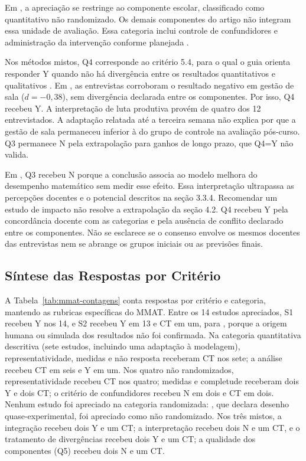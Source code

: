 Em , a apreciação se restringe ao componente escolar, classificado como quantitativo não randomizado. Os demais componentes do artigo não integram essa unidade de avaliação. Essa categoria inclui controle de confundidores e administração da intervenção conforme planejada \cite{MMAT2018}.

Nos métodos mistos, Q4 corresponde ao critério 5.4, para o qual o guia orienta responder Y quando não há divergência entre os resultados quantitativos e qualitativos \cite{MMATGuide2018}. Em , as entrevistas corroboram o resultado negativo em gestão de sala ($d=-0{,}38$), sem divergência declarada entre os componentes. Por isso, Q4 recebeu Y. A interpretação de luta produtiva provém de quatro dos 12 entrevistados. A adaptação relatada até a terceira semana não explica por que a gestão de sala permaneceu inferior à do grupo de controle na avaliação pós-curso. Q3 permanece N pela extrapolação para ganhos de longo prazo, que Q4=Y não valida.

Em , Q3 recebeu N porque a conclusão associa ao modelo melhora do desempenho matemático sem medir esse efeito. Essa interpretação ultrapassa as percepções docentes e o potencial descritos na seção 3.3.4. Recomendar um estudo de impacto não resolve a extrapolação da seção 4.2. Q4 recebeu Y pela concordância docente com as categorias e pela ausência de conflito declarado entre os componentes. Não se esclarece se o consenso envolve os mesmos docentes das entrevistas nem se abrange os grupos iniciais ou as previsões finais.

\subsection{Síntese das Respostas por Critério}

A Tabela~\ref{tab:mmat-contagens} conta respostas por critério e categoria, mantendo as rubricas específicas do MMAT. Entre os 14 estudos apreciados, S1 recebeu Y nos 14, e S2 recebeu Y em 13 e CT em um, para , porque a origem humana ou simulada dos resultados não foi confirmada. Na categoria quantitativa descritiva (sete estudos, incluindo uma adaptação à modelagem), representatividade, medidas e não resposta receberam CT nos sete; a análise recebeu CT em seis e Y em um. Nos quatro não randomizados, representatividade recebeu CT nos quatro; medidas e completude receberam dois Y e dois CT; o critério de confundidores recebeu N em dois e CT em dois. Nenhum estudo foi apreciado na categoria randomizada: , que declara desenho quase-experimental, foi apreciado como não randomizado. Nos três mistos, a integração recebeu dois Y e um CT; a interpretação recebeu dois N e um CT, e o tratamento de divergências recebeu dois Y e um CT; a qualidade dos componentes (Q5) recebeu dois N e um CT.

